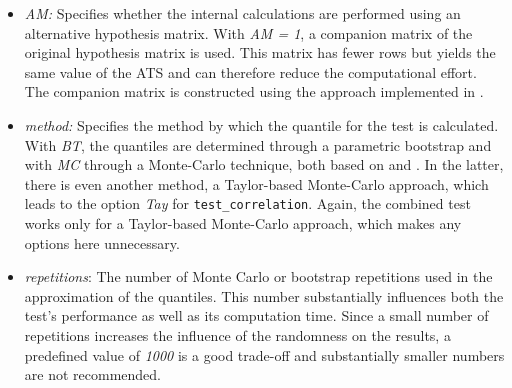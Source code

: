 \begin{itemize}
  \begin{itemize}
  \item
    For \texttt{test\_covariance} and \texttt{test\_correlation}, more experienced
    users could specify custom hypotheses through a hypothesis
    matrix together with a corresponding vector, as introduced in
    \citet{sattler2022} or \citet{sattler2023}, especially for
    less standard hypotheses, which increase flexibility. Both refer
    to the corresponding kind of upper triangular vectorization, and
    unlike in other procedures, the hypothesis matrix here has
    neither to be a projection matrix nor square. This especially
    allows structures from the linear covariance structure model and
    the linear correlation structure model by using the function
    \texttt{get\_hypothesis}.
  \item
    The function \texttt{test\_combined}, which jointly assesses the
    equality of covariance and correlation matrix, is restricted to
    one specific hypothesis. Consequently, this argument is not
    available in that context.
  \end{itemize}
\item
  \emph{AM:} Specifies whether the internal calculations are performed using an
  alternative hypothesis matrix. With \emph{AM = 1}, a companion matrix of
  the original hypothesis matrix is used. This matrix has fewer rows
  but yields the same value of the ATS and can therefore reduce the
  computational effort. The companion matrix is constructed using the
  approach implemented in \citep{HypoShrink}.
\item
  \emph{method:} Specifies the method by which the quantile for the test is
  calculated. With \emph{BT}, the quantiles are determined through a
  parametric bootstrap and with \emph{MC} through a Monte-Carlo technique,
  both based on \citet{sattler2022} and \citet{sattler2023}. In
  the latter, there is even another method, a Taylor-based Monte-Carlo
  approach, which leads to the option \emph{Tay} for \texttt{test\_correlation}.
  Again, the combined test works only for a Taylor-based Monte-Carlo
  approach, which makes any options here unnecessary.
\item
  \emph{repetitions}: The number of Monte Carlo or bootstrap repetitions
  used in the approximation of the quantiles. This number
  substantially influences both the test's performance as well as its
  computation time. Since a small number of repetitions increases the
  influence of the randomness on the results, a predefined value of
  \emph{1000} is a good trade-off and substantially smaller numbers are not
  recommended.
\end{itemize}

